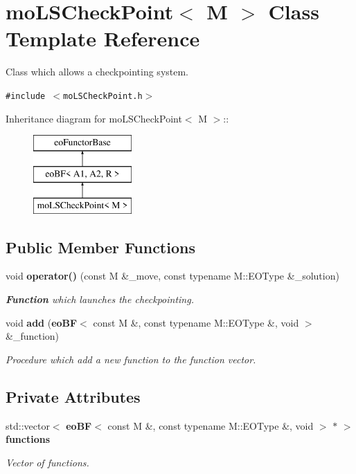 \section{moLSCheckPoint$<$ M $>$ Class Template Reference}
\label{classmo_l_s_check_point}
Class which allows a checkpointing system.  


{\tt \#include $<$moLSCheckPoint.h$>$}

Inheritance diagram for moLSCheckPoint$<$ M $>$::\begin{figure}[H]
\begin{center}
\leavevmode
\includegraphics[height=3cm]{classmo_l_s_check_point}
\end{center}
\end{figure}
\subsection*{Public Member Functions}
\begin{CompactItemize}
\item 
void {\bf operator()} (const M \&\_\-move, const typename M::EOType \&\_\-solution)
\begin{CompactList}\small\item\em {\bf Function} which launches the checkpointing. \item\end{CompactList}\item 
void {\bf add} ({\bf eoBF}$<$ const M \&, const typename M::EOType \&, void $>$ \&\_\-function)
\begin{CompactList}\small\item\em Procedure which add a new function to the function vector. \item\end{CompactList}\end{CompactItemize}
\subsection*{Private Attributes}
\begin{CompactItemize}
\item 
std::vector$<$ {\bf eoBF}$<$ const M \&, const typename M::EOType \&, void $>$ $\ast$ $>$ {\bf functions}\label{classmo_l_s_check_point_56a7427a6aebac7955c22bab302c050a}

\begin{CompactList}\small\item\em Vector of functions. \item\end{CompactList}\end{CompactItemize}


